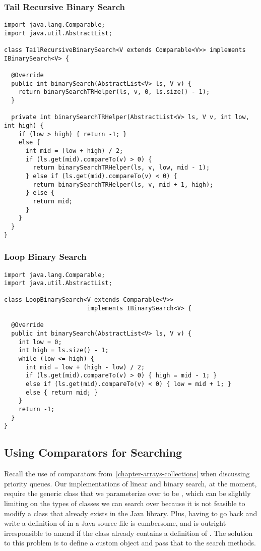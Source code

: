 \newpage %
\subsubsection*{Tail Recursive Binary Search}

\begin{lstlisting}[language=MyJava]
import java.lang.Comparable;
import java.util.AbstractList;

class TailRecursiveBinarySearch<V extends Comparable<V>> implements IBinarySearch<V> {

  @Override
  public int binarySearch(AbstractList<V> ls, V v) {
    return binarySearchTRHelper(ls, v, 0, ls.size() - 1);
  }

  private int binarySearchTRHelper(AbstractList<V> ls, V v, int low, int high) {
    if (low > high) { return -1; }
    else {
      int mid = (low + high) / 2;
      if (ls.get(mid).compareTo(v) > 0) { 
        return binarySearchTRHelper(ls, v, low, mid - 1); 
      } else if (ls.get(mid).compareTo(v) < 0) { 
        return binarySearchTRHelper(ls, v, mid + 1, high); 
      } else { 
        return mid; 
      }
    }
  }
}
\end{lstlisting}

\subsubsection*{Loop Binary Search}

\begin{lstlisting}[language=MyJava]
import java.lang.Comparable;
import java.util.AbstractList;
  
class LoopBinarySearch<V extends Comparable<V>> 
                       implements IBinarySearch<V> {
  
  @Override
  public int binarySearch(AbstractList<V> ls, V v) {
    int low = 0;
    int high = ls.size() - 1;
    while (low <= high) {
      int mid = low + (high - low) / 2;
      if (ls.get(mid).compareTo(v) > 0) { high = mid - 1; } 
      else if (ls.get(mid).compareTo(v) < 0) { low = mid + 1; } 
      else { return mid; }
    }
    return -1;
  }
}
\end{lstlisting}

\subsection{Using Comparators for Searching}
Recall the use of comparators from~\ref{chapter-arrays-collections} when discussing priority queues. 
Our implementations of linear and binary search, at the moment, require the generic class that we parameterize over to be , which can be slightly limiting on the types of classes we can search over because it is not feasible to modify a class that already exists in the Java library. 
Plus, having to go back and write a definition of  in a Java source file is cumbersome, and is outright irresponsible to amend if the class already contains a definition of .
The solution to this problem is to define a custom  object and pass that to the search methods. 

